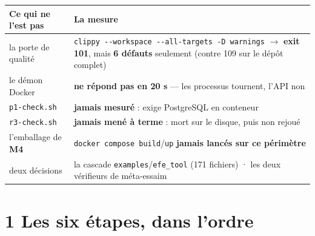 \documentclass[11pt]{article}
\newcommand{\code}[1]{\texttt{\small #1}}
\newcommand{\best}[1]{{\color{efesolve}\textbf{#1}}}
\newcommand{\pire}[1]{{\color{efered}\textbf{#1}}}
\newcommand{\mm}[1]{\textbf{#1}}
\newcommand{\fl}{$\rightarrow$}
\begin{document}
\begin{center}\small
\renewcommand{\arraystretch}{1.25}
\begin{tabular}{@{}>{\raggedright\arraybackslash}p{5.3cm} >{\raggedright\arraybackslash}p{10.9cm}@{}}
\toprule
\textbf{Ce qui ne l'est pas} & \textbf{La mesure} \\
\midrule
la porte de qualité & \code{clippy -{}-workspace -{}-all-targets -D warnings} \fl{} \pire{exit 101}, mais \best{6 défauts} seulement (contre 109 sur le dépôt complet) \\
le démon Docker & \pire{ne répond pas en 20 s} --- les processus tournent, l'API non \\
\code{p1-check.sh} & \pire{jamais mesuré} : exige PostgreSQL en conteneur \\
\code{r3-check.sh} & \pire{jamais mené à terme} : mort sur le disque, puis non rejoué \\
l'emballage de \mm{M4} & \code{docker compose build}/\code{up} \pire{jamais lancés sur ce périmètre} \\
deux décisions & la cascade \code{examples}/\code{efe\_tool} (171 fichiers) · les deux vérifieurs de méta-essaim \\
\bottomrule
\end{tabular}
\end{center}

\section{1 \;\textbar\; Les six étapes, dans l'ordre}
\end{document}
